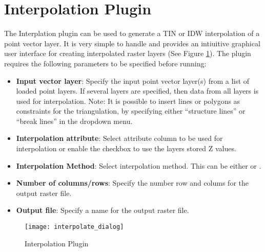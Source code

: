 
\section{Interpolation Plugin}


The Interplation plugin can be used to generate a TIN or IDW interpolation of a 
point vector layer. It is very simple to handle and provides an intiuitive graphical 
user interface for creating interpolated raster layers (See Figure \ref{fig:interpolation_dialog}).
The plugin requires the following parameters to be specified before running:

\begin{itemize}[label=--]
\item \textbf{Input vector layer}: Specify the input point vector layer(s) from a list of loaded
point layers. If several layers are specified, then data from all layers is used for
interpolation. Note: It is possible to insert lines or polygons as constraints for the
triangulation, by specifying either ``structure lines'' or ``break lines'' in the
 dropdown menu.
\item \textbf{Interpolation attribute}: Select attribute column to be used for interpolation or 
enable the  checkbox to use the layers stored Z values.
\item \textbf{Interpolation Method}: Select interpolation method. This can be either  or .
\item \textbf{Number of columns/rows}: Specify the number row and colums for the output raster file.
\item \textbf{Output file}: Specify a name for the output raster file.
\end{itemize}

\begin{figure}[ht]
   \centering
   \texttt{[image: interpolate\_dialog]}
   \caption{Interpolation Plugin \nixcaption}\label{fig:interpolation_dialog}
\end{figure}

\label{interpolation_usage}


